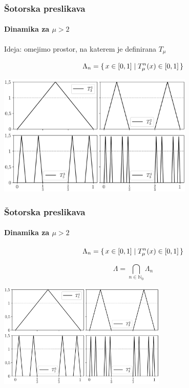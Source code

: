 \documentclass[12pt]{beamer}
\newcommand{\N}{\mathbb N}
\begin{document}
\begin{frame}
\frametitle{Šotorska preslikava}
\framesubtitle{Dinamika za $\mu > 2$}

Ideja: omejimo prostor, na katerem je definirana $T_\mu$

\medskip

$$ \Lambda_n = \set{ x \in [0,1] \mid T_\mu^n(x) \in [0,1] } $$

\medskip

\centering
\includegraphics[width=0.7\textwidth]{tent_3.png}

\end{frame}


\begin{frame}
\frametitle{Šotorska preslikava}
\framesubtitle{Dinamika za $\mu > 2$}

$$ \Lambda_n = \set{ x \in [0,1] \mid T_\mu^n(x) \in [0,1] } $$

\medskip

$$ \Lambda = \bigcap_{n \in \N_0} \Lambda_n $$

\centering
\includegraphics[width=0.6\textwidth]{tent_3.png}

\end{frame}
\end{document}
